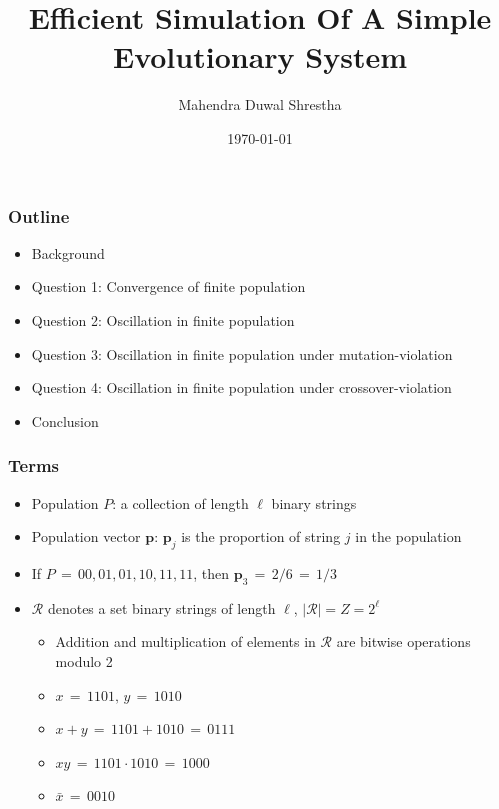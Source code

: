 \documentclass[aspectratio=169]{beamer}
\title{Efficient Simulation Of A Simple Evolutionary System}
\author{Mahendra Duwal Shrestha}
\institute{The University Of Tenessee}
\date{\today}
\begin{document}
  \begin{frame}
    \titlepage
  \end{frame}

  \begin{frame}
    \frametitle{Outline}
    \begin{itemize}
      \item{Background}
      \item{Question 1: Convergence of finite population}
      \item{Question 2: Oscillation in finite population}
      \item{Question 3: Oscillation in finite population under mutation-violation}
      \item{Question 4: Oscillation in finite population under crossover-violation}
      \item{Conclusion}
    \end{itemize}
  \end{frame}

  \begin{frame}
    \frametitle{Terms}
    \begin{itemize}
      \item{Population $P$: a collection of length $\ell$ binary strings}
      \item{Population vector $\bm{p}$: $\bm{p}_j$ is the proportion of string $j$ in the population}
      \item{If $P \,=\, {00, 01, 01, 10, 11, 11}$, then $\bm{p}_3 \,=\, 2/6 \,=\, 1/3$}
      \item{$\mathcal{R}$ denotes a set binary strings of length $\ell$, $|\mathcal{R}| = Z = 2^\ell$ }
      \begin{itemize}
	\item{Addition and multiplication of elements in $\mathcal{R}$ are bitwise operations modulo 2}
	\item{$x \,=\, 1101,\, y \,=\, 1010 $}
	\item{$x + y \,=\, 1101 + 1010 \,=\, 0111$}
	\item{$xy \,=\, 1101 \cdot 1010 \,=\, 1000$}
	\item{$\bar{x} \,=\, 0010$}
      \end{itemize}
    \end{itemize}
  \end{frame}
  
\end{document}
